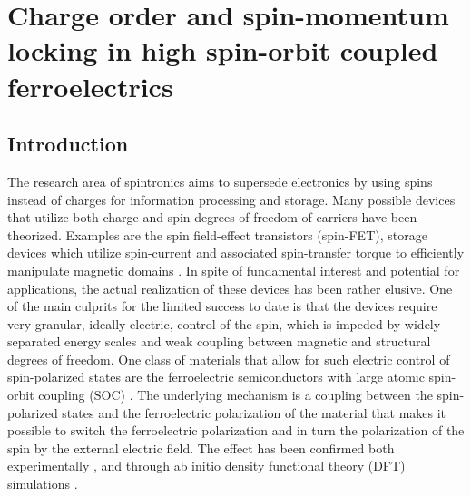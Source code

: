 \chapter{Charge order and spin-momentum locking in high spin-orbit coupled ferroelectrics}
\section{Introduction}
The research area of spintronics aims to supersede electronics by using spins instead of charges for information processing and storage. %
Many possible devices that utilize both charge and spin degrees of freedom of carriers have been theorized. Examples are the spin field-effect transistors (spin-FET)\cite{Datta1990}, storage devices which utilize spin-current and associated spin-transfer torque to efficiently manipulate magnetic domains \cite{Kent2015,Jungwirth2016}. In spite of fundamental interest and potential for applications, the actual realization of these devices has been rather elusive. One of the main culprits for the limited success to date is that the devices require very granular, ideally electric, control of the spin, which is impeded by widely separated energy scales and weak coupling between magnetic and structural degrees of freedom. One class of materials that allow for such electric control of spin-polarized states are the ferroelectric semiconductors with large atomic spin-orbit coupling (SOC) \cite{DiSante2013,Ishizaka2011,Kim2014}. The underlying mechanism is a coupling between the spin-polarized states and the ferroelectric polarization of the material that makes it possible to switch the ferroelectric polarization and in turn the polarization of the spin by the external electric field. The effect has been confirmed both experimentally \cite{Ishizaka2011,Liebmann2016,Krempasky2015SurfaceSemiconductor}, and through ab initio density functional theory (DFT) simulations \cite{DiSante2013}. 

